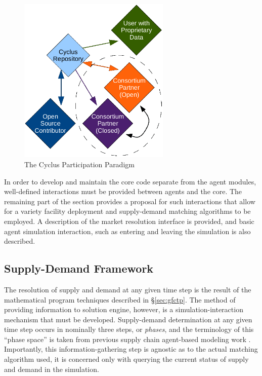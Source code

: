 \begin{figure}[htbp!]
  \begin{center}
    \includegraphics[height=8cm]{./chapters/research/community.png}
  \end{center}
  \caption{The Cyclus Participation Paradigm} 
  \label{fig:community}
\end{figure}

In order to develop and maintain the core code separate from the agent modules,
well-defined interactions must be provided between agents and the \Cyclus
core. The remaining part of the section provides a proposal for such
interactions that allow for a variety facility deployment and supply-demand
matching algorithms to be employed. A description of the market resolution
interface is provided, and basic agent simulation interaction, such as entering
and leaving the simulation is also described.

\subsection{Supply-Demand Framework}

The resolution of supply and demand at any given time step is the result of the
mathematical program techniques described in \S\ref{sec:gfctp}. The method of
providing information to solution engine, however, is a simulation-interaction
mechanism that must be developed. Supply-demand determination at any given time
step occurs in nominally three steps, or \textit{phases}, and the terminology of
this ``phase space'' is taken from previous supply chain agent-based modeling
work \cite{julka_agent-based_2002}. Importantly, this information-gathering step
is agnostic as to the actual matching algorithm used, it is concerned only with
querying the current status of supply and demand in the simulation.

